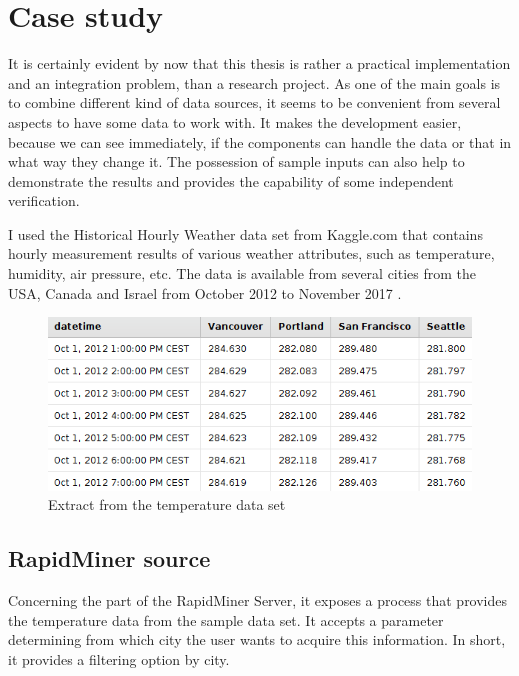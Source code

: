 \chapter{Case study} \label{case-study}

It is certainly evident by now that this thesis is rather a practical implementation and an integration problem, than a research project. As one of the main goals is to combine different kind of data sources, it seems to be convenient from several aspects to have some data to work with. It makes the development easier, because we can see immediately, if the components can handle the data or that in what way they change it. The possession of sample inputs can also help to demonstrate the results and provides the capability of some independent verification.

I used the Historical Hourly Weather data set from Kaggle.com that contains hourly measurement results of various weather attributes, such as temperature, humidity, air pressure, etc. The data is available from several cities from the USA, Canada and Israel from October 2012 to November 2017 \cite{kaggle-data}.

\begin{figure}[h]
	\centering
	\includegraphics[width=130mm, keepaspectratio]{figures/weather-data-extract.png}
	\caption{Extract from the temperature data set}
	\label{fig:weather-data-extract}
\end{figure}

\section{RapidMiner source}

Concerning the part of the RapidMiner Server, it exposes a process that provides the temperature data from the sample data set. It accepts a parameter determining from which city the user wants to acquire this information. In short, it provides a filtering option by city.

